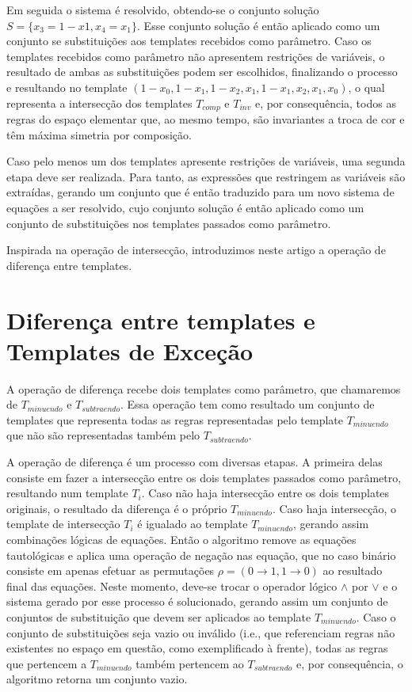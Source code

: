 \documentclass[12pt, a4paper]{article}
\begin{document}
Em seguida o sistema é resolvido, obtendo-se o conjunto solução $S = \{x_3 = 1-x1, x_4 = x_1\}$. Esse conjunto solução é então aplicado como um conjunto se substituições aos templates recebidos como parâmetro. Caso os templates recebidos como parâmetro não apresentem restrições de variáveis, o resultado de ambas as substituições podem ser escolhidos, finalizando o processo e resultando no template $(1 - x_0, 1 - x_1, 1 - x_2, x_1, 1 - x_1, x_2, x_1, x_0)$, o qual representa a intersecção dos templates $T_{comp}$ e $T_{inv}$ e, por consequência, todos as regras do espaço elementar que, ao mesmo tempo, são invariantes a troca de cor e têm máxima simetria por composição.

Caso pelo menos um dos templates apresente restrições de variáveis, uma segunda etapa deve ser realizada. Para tanto, as expressões que restringem as variáveis são extraídas, gerando um conjunto que é então traduzido para um novo sistema de equações a ser resolvido, cujo conjunto solução é então aplicado como um conjunto de substituições nos templates passados como parâmetro.

Inspirada na operação de intersecção, introduzimos neste artigo a operação de diferença entre templates.

\section{Diferença entre templates e Templates de Exceção}
\label{sec:diferenca_entre_templates_e_templates_de_excecao}

A operação de diferença recebe dois templates como parâmetro, que chamaremos de $T_{minuendo}$ e $T_{subtraendo}$. Essa operação tem como resultado um conjunto de templates que representa todas as regras representadas pelo template $T_{minuendo}$ que não são representadas também pelo $T_{subtraendo}$.

A operação de diferença é um processo com diversas etapas. A primeira delas consiste em fazer a intersecção entre os dois templates passados como parâmetro, resultando num template $T_i$. Caso não haja intersecção entre os dois templates originais, o resultado da diferença é o próprio $T_{minuendo}$. Caso haja intersecção, o template de intersecção $T_i$ é igualado ao template $T_{minuendo}$, gerando assim combinações lógicas de equações. Então o algoritmo remove as equações tautológicas e aplica uma operação de negação nas equação, que no caso binário consiste em apenas efetuar as permutações $\rho = (0 \to 1, 1 \to 0)$ ao resultado final das equações. Neste momento, deve-se trocar o operador lógico $\wedge$ por $\vee$ e o sistema gerado por esse processo é solucionado, gerando assim um conjunto de conjuntos de substituição que devem ser aplicados ao template $T_{minuendo}$. Caso o conjunto de substituições seja vazio ou inválido (i.e., que referenciam regras não existentes no espaço em questão, como exemplificado à frente), todas as regras que pertencem a $T_{minuendo}$ também pertencem ao $T_{subtraendo}$ e, por consequência, o algoritmo retorna um conjunto vazio.
\end{document}
